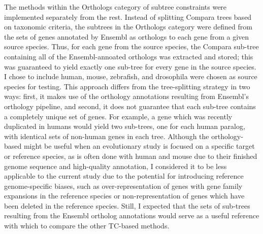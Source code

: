 The methods within the Orthologs category of subtree constraints were
implemented separately from the rest. Instead of splitting Compara
trees based on taxonomic criteria, the subtrees in the Orthologs
category were defined from the sets of genes annotated by Ensembl as
orthologs to each gene from a given source species. Thus, for each
gene from the source species, the Compara sub-tree containing all of
the Ensembl-annoated orthologs was extracted and stored; this was
guaranteed to yield exactly one sub-tree for every gene in the source
species. I chose to include human, mouse, zebrafish, and drosophila
were chosen as source species for testing. This approach differs from
the tree-splitting strategy in two ways: first, it makes use of the
orthology annotations resulting from Ensembl's orthology pipeline, and
second, it does not guarantee that each sub-tree contains a completely
unique set of genes. For example, a gene which was recently duplicated
in humans would yield two sub-trees, one for each human paralog, with
identical sets of non-human genes in each tree. Although the
orthology-based might be useful when an evolutionary study is focused
on a specific target or reference species, as is often done with human
and mouse due to their finished genome sequence and high-quality
annotation, I considered it to be less applicable to the current study
due to the potential for introducing reference genome-specific biases,
such as over-representation of genes with gene family expansions in
the reference species or non-representation of genes which have been
deleted in the reference species. Still, I expected that the sets of
sub-trees resulting from the Ensembl ortholog annotations would serve
as a useful reference with which to compare the other TC-based
methods.

